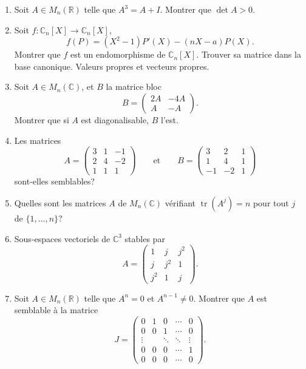 \begin{enumerate}[label=\arabic*.,leftmargin=2.2em,itemsep=1.0em]

\item Soit $A\in M_n(\mathbb R)$ telle que $A^3=A+I$. Montrer que $\det A>0$.

\item Soit $f:\mathbb C_n[X]\longrightarrow\mathbb C_n[X]$,
\[
f(P)=(X^2-1)P'(X)-(nX-a)P(X).
\]
Montrer que $f$ est un endomorphisme de $\mathbb C_n[X]$. Trouver sa matrice dans la base canonique. Valeurs propres et vecteurs propres.

\item Soit $A\in M_n(\mathbb C)$, et $B$ la matrice bloc
\[
B=\begin{pmatrix}2A&-4A\\ A&-A\end{pmatrix}.
\]
Montrer que si $A$ est diagonalisable, $B$ l'est.

\item Les matrices
\[
A=\begin{pmatrix}3&1&-1\\2&4&-2\\1&1&1\end{pmatrix}
\qquad\text{et}\qquad
B=\begin{pmatrix}3&2&1\\1&4&1\\-1&-2&1\end{pmatrix}
\]
sont-elles semblables?

\item Quelles sont les matrices $A$ de $M_n(\mathbb C)$ vérifiant $\operatorname{tr}(A^j)=n$ pour tout $j$ de $\{1,\ldots,n\}$?

\item Sous-espaces vectoriels de $\mathbb C^3$ stables par
\[
A=\begin{pmatrix}
1&j&j^2\\
j&j^2&1\\
j^2&1&j
\end{pmatrix}.
\]

\item Soit $A\in M_n(\mathbb R)$ telle que $A^n=0$ et $A^{n-1}\ne0$. Montrer que $A$ est semblable à la matrice
\[
J=\begin{pmatrix}
0&1&0&\cdots&0\\
0&0&1&\cdots&0\\
\vdots&&\ddots&\ddots&\vdots\\
0&0&0&\cdots&1\\
0&0&0&\cdots&0
\end{pmatrix}.
\]


\end{enumerate}
